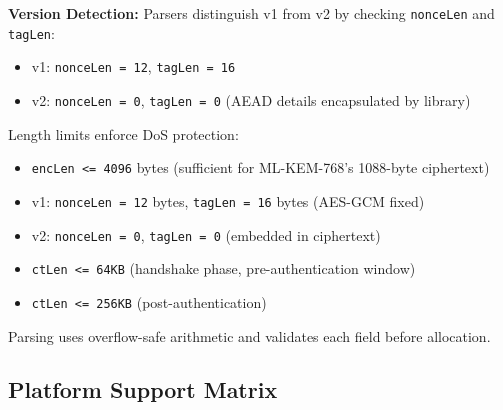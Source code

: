\documentclass[10pt,journal,compsoc]{IEEEtran}
\providecommand{\tightlist}{%
	  \setlength{\itemsep}{0pt}\setlength{\parskip}{0pt}}
\begin{document}
\textbf{Version Detection:} Parsers distinguish v1 from v2 by checking
\texttt{nonceLen} and \texttt{tagLen}:
\begin{itemize}\raggedright\tightlist
\item
  v1: \texttt{nonceLen = 12}, \texttt{tagLen = 16}
\item
  v2: \texttt{nonceLen = 0}, \texttt{tagLen = 0} (AEAD details
  encapsulated by library)
\end{itemize}

Length limits enforce DoS protection:
\begin{itemize}\raggedright\tightlist
\item
  \texttt{encLen <= 4096} bytes (sufficient for ML-KEM-768's 1088-byte
  ciphertext)
\item
  v1: \texttt{nonceLen = 12} bytes, \texttt{tagLen = 16} bytes (AES-GCM
  fixed)
\item
  v2: \texttt{nonceLen = 0}, \texttt{tagLen = 0} (embedded in ciphertext)
\item
  \texttt{ctLen <= 64KB} (handshake phase, pre-authentication window)
\item
  \texttt{ctLen <= 256KB} (post-authentication)
\end{itemize}

Parsing uses overflow-safe arithmetic and validates each field before
allocation.

\subsection*{Platform Support Matrix}
\end{document}
